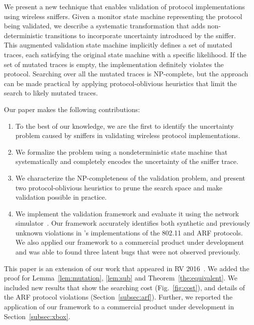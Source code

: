 We present a new technique that enables validation of protocol implementations using
wireless sniffers. Given a monitor state machine representing the protocol being
validated, we describe a systematic transformation that adds non-deterministic
transitions to incorporate uncertainty introduced by the sniffer. This
augmented validation state machine implicitly defines a set of
mutated traces, each satisfying the original state machine with a specific
likelihood. If the set of mutated traces is empty, the implementation definitely violates the
protocol. Searching over all the mutated traces is NP-complete, but the approach
can be made practical by applying protocol-oblivious heuristics that limit the
search to likely mutated traces.

Our paper makes the following contributions:
\begin{enumerate}
  \item To the best of our knowledge, we are the first to identify the
    uncertainty problem caused by sniffers in validating wireless protocol
    implementations.
  \item We formalize the problem using a nondeterministic state machine that
    systematically and completely encodes the uncertainty of the
    sniffer trace.
  \item We characterize the NP-completeness of the validation problem, and
    present two protocol-oblivious heuristics to prune the search space and make
    validation possible in practice.
  \item We implement the validation framework and evaluate it using the \ns{}
    network simulator~\cite{riley2010ns}. Our framework accurately identifies
    both synthetic and previously unknown violations in \ns{}'s implementations
    of the 802.11 and ARF protocols.  We also applied our framework to a
    commercial product under development and was able to found three latent bugs
    that were not observed previously.
\end{enumerate}

This paper is an extension of our work that appeared in RV 2016~\cite{Shi2016}.
We added the proof for Lemma~\ref{lem:mutation}, \ref{lem:sub} and
Theorem~\ref{the:equivalent}. We included new results that show the searching
cost (Fig.~\ref{fig:cost}), and details of the ARF protocol violations
(Section~\ref{subsec:arf}). Further, we reported the application of our
framework to a commercial product under development in
Section~\ref{subsec:xbox}.
